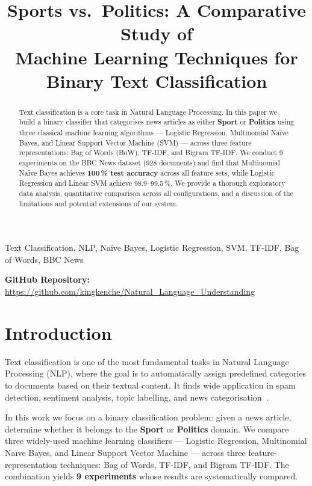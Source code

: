 \documentclass[conference, 10pt]{IEEEtran}
\title{Sports vs.\ Politics: A Comparative Study of\\Machine Learning Techniques for Binary Text Classification}
\author{
  \IEEEauthorblockN{NLU Assignment-1, Problem 4}
  \IEEEauthorblockA{
    Natural Language Understanding Course\\
    February 2026
  }
}
\begin{document}
\maketitle

\begin{abstract}
Text classification is a core task in Natural Language Processing.
In this paper we build a binary classifier that categorises news articles as either \textbf{Sport} or \textbf{Politics} using three classical machine learning algorithms --- Logistic Regression, Multinomial Na\"ive Bayes, and Linear Support Vector Machine (SVM) --- across three feature representations: Bag of Words (BoW), TF-IDF, and Bigram TF-IDF.
We conduct 9 experiments on the BBC News dataset (928 documents) and find that Multinomial Na\"ive Bayes achieves \textbf{100\,\% test accuracy} across all feature sets, while Logistic Regression and Linear SVM achieve 98.9--99.5\,\%.
We provide a thorough exploratory data analysis, quantitative comparison across all configurations, and a discussion of the limitations and potential extensions of our system.
\end{abstract}

\begin{IEEEkeywords}
Text Classification, NLP, Na\"ive Bayes, Logistic Regression, SVM, TF-IDF, Bag of Words, BBC News
\end{IEEEkeywords}

\vspace{0.5em}
\noindent\textbf{GitHub Repository:} \url{https://github.com/kingkenche/Natural_Language_Understanding}

\section{Introduction}

Text classification is one of the most fundamental tasks in Natural Language Processing (NLP), where the goal is to automatically assign predefined categories to documents based on their textual content.
It finds wide application in spam detection, sentiment analysis, topic labelling, and news categorisation~\cite{manning2008}.

In this work we focus on a binary classification problem: given a news article, determine whether it belongs to the \textbf{Sport} or \textbf{Politics} domain.
We compare three widely-used machine learning classifiers --- Logistic Regression, Multinomial Na\"ive Bayes, and Linear Support Vector Machine --- across three feature-representation techniques: Bag of Words, TF-IDF, and Bigram TF-IDF.
The combination yields \textbf{9 experiments} whose results are systematically compared.
\end{document}
